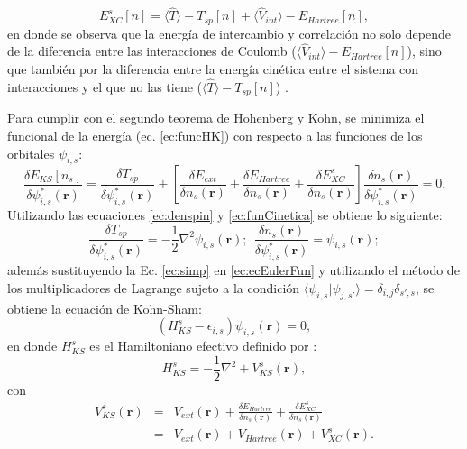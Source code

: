    \begin{equation}
   E_{XC}^s [n]= \langle \hat{T} \rangle - T_{sp} [n]+\langle \hat{V}_{int} \rangle-E_{Hartree} [n] \label{ec:Exc2},
   \end{equation}
    en donde se observa que la energ\'ia de intercambio y correlaci\'on no solo depende de la diferencia entre las interacciones de Coulomb ($\langle \hat{V}_{int} \rangle-E_{Hartree}[n]$), sino que tambi\'en por la diferencia entre la energ\'ia cin\'etica entre el sistema con interacciones y el que no las tiene ($ \langle \hat{T} \rangle - T_{sp} [n] $) \cite{MB-2015}.
   \newline
   \par Para cumplir con el segundo teorema de Hohenberg y Kohn, se minimiza el funcional de la energ\'ia (ec. \ref{ec:funcHK}) con respecto  a las funciones de los orbitales $\psi_{i,s } $: 
   \begin{equation}
   \frac{\delta E_{KS} [n_s]}{\delta \psi_{i,s } ^* (\pmb{r})}= \frac{\delta T_{sp} }{\delta \psi_{i,s } ^* (\pmb{r}) } + \left[\frac{\delta E_{ext}}{\delta n_s (\pmb{r})}+\frac{\delta E_{Hartree}}{\delta n_s (\pmb{r})}+  \frac{\delta E_{XC}^s}{\delta n_s (\pmb{r})}\right] \frac{\delta n_s (\pmb{r})}{\delta \psi_{i,s } ^* (\pmb{r})} =0. \label{ec:ecEulerFun}
   \end{equation}
   Utilizando las ecuaciones \ref{ec:denspin} y \ref{ec:funCinetica} se obtiene lo siguiente:
   \begin{equation}
   \frac{\delta T_{sp} }{\delta \psi_{i,s } ^* (\pmb{r}) }= -\frac{1}{2} \nabla^2 \psi_{i,s } (\pmb{r}); ~~ \frac{\delta n_s (\pmb{r})}{\delta \psi_{i,s } ^* (\pmb{r})}= \psi_{i,s } (\pmb{r}) \label{ec:simp};
   \end{equation} 
   adem\'as sustituyendo  la Ec. \ref{ec:simp} en \ref{ec:ecEulerFun}    y utilizando el m\'etodo de los multiplicadores de Lagrange  sujeto a la condici\'on $\langle \psi_{i,s} | \psi_{j,s'} \rangle =   \delta_{i,j}\delta_{s',s}$,   se obtiene la ecuaci\'on de Kohn-Sham:
   \begin{equation}
   (H_{KS}^s -\epsilon_{i,s})\psi_{i,s } (\pmb{r}) = 0 \label{ec:ShKS},
   \end{equation}
   en donde $ H_{KS}^s $ es el Hamiltoniano efectivo definido por \cite{PhysRev.140.A1133}:
   \begin{equation}
    H_{KS}^s = -\frac{1}{2} \nabla^2 + V_{KS}^s (\pmb{r}), \label{ec:HamiltonianoKS}
   \end{equation}
   con
   \begin{eqnarray}
     V_{KS}^s (\pmb{r}) &=& V_{ext} (\pmb{r})+  \frac{\delta E_{Hartree}}{\delta n_s (\pmb{r})}+  \frac{\delta E_{XC}^s}{\delta n_s (\pmb{r})} \nonumber \\
      &=& V_{ext} (\pmb{r})+ V_{Hartree} (\pmb{r}) + V_{XC}^s (\pmb{r}). \label{ec:potKS} 
   \end{eqnarray}
